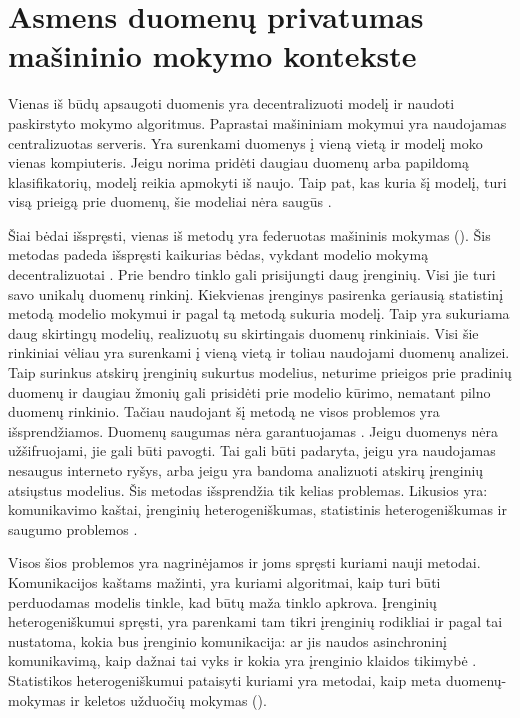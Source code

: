 \documentclass{VUMIFInfBakalaurinis}
\begin{document}
\section{Asmens duomenų privatumas mašininio mokymo kontekste}
	\par Vienas iš būdų apsaugoti duomenis yra decentralizuoti modelį ir naudoti paskirstyto mokymo algoritmus. Paprastai mašininiam mokymui yra naudojamas centralizuotas serveris. Yra surenkami duomenys į vieną vietą ir modelį moko vienas kompiuteris. Jeigu norima pridėti daugiau duomenų arba papildomą klasifikatorių, modelį reikia apmokyti iš naujo. Taip pat, kas kuria šį modelį, turi visą prieigą prie duomenų, šie modeliai nėra saugūs \cite{13}. 
	\par Šiai bėdai išspręsti, vienas iš metodų yra federuotas mašininis mokymas (). Šis metodas padeda išspręsti kaikurias bėdas, vykdant modelio mokymą decentralizuotai \cite{3}. Prie bendro tinklo gali prisijungti daug įrenginių. Visi jie turi savo unikalų duomenų rinkinį. Kiekvienas įrenginys pasirenka geriausią statistinį metodą modelio mokymui ir pagal tą metodą sukuria modelį. Taip yra sukuriama daug skirtingų modelių, realizuotų su skirtingais duomenų rinkiniais. Visi šie rinkiniai vėliau yra surenkami į vieną vietą ir toliau naudojami duomenų analizei. Taip surinkus atskirų įrenginių sukurtus modelius, neturime prieigos prie pradinių duomenų ir daugiau žmonių gali prisidėti prie modelio kūrimo, nematant pilno duomenų rinkinio. Tačiau naudojant šį metodą ne visos problemos yra išsprendžiamos. Duomenų saugumas nėra garantuojamas \cite{3}. Jeigu duomenys nėra užšifruojami, jie gali būti pavogti. Tai gali būti padaryta, jeigu yra naudojamas nesaugus interneto ryšys, arba jeigu yra bandoma analizuoti atskirų įrenginių atsiųstus modelius. Šis metodas išsprendžia tik kelias problemas. Likusios yra: komunikavimo kaštai, įrenginių heterogeniškumas, statistinis heterogeniškumas ir saugumo problemos \cite{4}.
	\par Visos šios problemos yra nagrinėjamos ir joms spręsti kuriami nauji metodai. Komunikacijos kaštams mažinti, yra kuriami algoritmai, kaip turi būti perduodamas modelis tinkle, kad būtų maža tinklo apkrova. Įrenginių heterogeniškumui spręsti, yra parenkami tam tikri įrenginių rodikliai ir pagal tai nustatoma, kokia bus įrenginio komunikacija: ar jis naudos asinchroninį komunikavimą, kaip dažnai tai vyks ir kokia yra įrenginio klaidos tikimybė \cite{4}. Statistikos heterogeniškumui pataisyti kuriami yra metodai, kaip meta duomenų-mokymas ir keletos užduočių mokymas (). 
\end{document}
